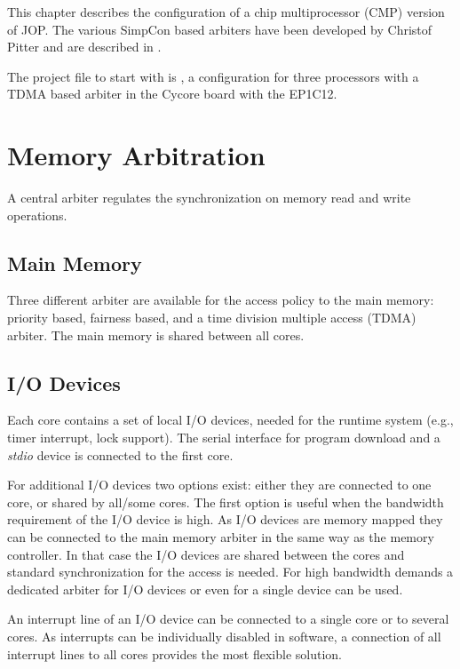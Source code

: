 
This chapter describes the configuration of a chip multiprocessor
(CMP) version of JOP. The various SimpCon based arbiters have been
developed by Christof Pitter and are described in \cite{jop:dma,
jop:cmp, jop:cmp:eval}.

The project file to start with is , a configuration for
three processors with a TDMA based arbiter in the Cycore board with
the EP1C12.

\section{Memory Arbitration}

A central arbiter regulates the synchronization on memory read and
write operations.

\subsection{Main Memory}

Three different arbiter are available for the access policy to the
main memory: priority based, fairness based, and a time division
multiple access (TDMA) arbiter. The main memory is shared between all
cores.

\subsection{I/O Devices}

Each core contains a set of local I/O devices, needed for the runtime
system (e.g., timer interrupt, lock support). The serial interface
for program download and a \emph{stdio} device is connected to the
first core.

For additional I/O devices two options exist: either they are
connected to one core, or shared by all/some cores. The first option
is useful when the bandwidth requirement of the I/O device is high.
As I/O devices are memory mapped they can be connected to the main
memory arbiter in the same way as the memory controller. In that case
the I/O devices are shared between the cores and standard
synchronization for the access is needed. For high bandwidth demands
a dedicated arbiter for I/O devices or even for a single device can
be used.

An interrupt line of an I/O device can be connected to a single core
or to several cores. As interrupts can be individually disabled in
software, a connection of all interrupt lines to all cores provides
the most flexible solution.







